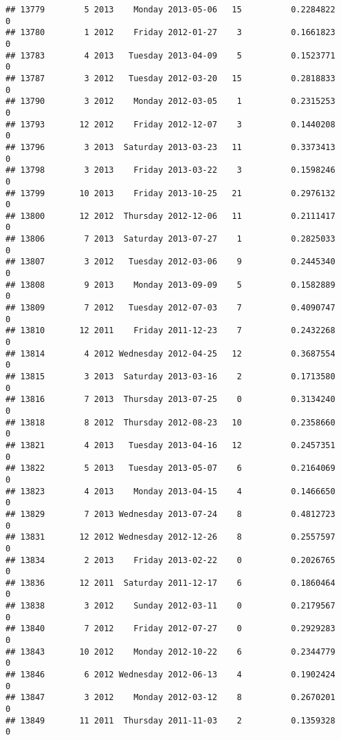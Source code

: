\documentclass[
]{article}
\begin{document}
\begin{verbatim}
## 13779        5 2013    Monday 2013-05-06   15          0.2284822             0
## 13780        1 2012    Friday 2012-01-27    3          0.1661823             0
## 13783        4 2013   Tuesday 2013-04-09    5          0.1523771             0
## 13787        3 2012   Tuesday 2012-03-20   15          0.2818833             0
## 13790        3 2012    Monday 2012-03-05    1          0.2315253             0
## 13793       12 2012    Friday 2012-12-07    3          0.1440208             0
## 13796        3 2013  Saturday 2013-03-23   11          0.3373413             0
## 13798        3 2013    Friday 2013-03-22    3          0.1598246             0
## 13799       10 2013    Friday 2013-10-25   21          0.2976132             0
## 13800       12 2012  Thursday 2012-12-06   11          0.2111417             0
## 13806        7 2013  Saturday 2013-07-27    1          0.2825033             0
## 13807        3 2012   Tuesday 2012-03-06    9          0.2445340             0
## 13808        9 2013    Monday 2013-09-09    5          0.1582889             0
## 13809        7 2012   Tuesday 2012-07-03    7          0.4090747             0
## 13810       12 2011    Friday 2011-12-23    7          0.2432268             0
## 13814        4 2012 Wednesday 2012-04-25   12          0.3687554             0
## 13815        3 2013  Saturday 2013-03-16    2          0.1713580             0
## 13816        7 2013  Thursday 2013-07-25    0          0.3134240             0
## 13818        8 2012  Thursday 2012-08-23   10          0.2358660             0
## 13821        4 2013   Tuesday 2013-04-16   12          0.2457351             0
## 13822        5 2013   Tuesday 2013-05-07    6          0.2164069             0
## 13823        4 2013    Monday 2013-04-15    4          0.1466650             0
## 13829        7 2013 Wednesday 2013-07-24    8          0.4812723             0
## 13831       12 2012 Wednesday 2012-12-26    8          0.2557597             0
## 13834        2 2013    Friday 2013-02-22    0          0.2026765             0
## 13836       12 2011  Saturday 2011-12-17    6          0.1860464             0
## 13838        3 2012    Sunday 2012-03-11    0          0.2179567             0
## 13840        7 2012    Friday 2012-07-27    0          0.2929283             0
## 13843       10 2012    Monday 2012-10-22    6          0.2344779             0
## 13846        6 2012 Wednesday 2012-06-13    4          0.1902424             0
## 13847        3 2012    Monday 2012-03-12    8          0.2670201             0
## 13849       11 2011  Thursday 2011-11-03    2          0.1359328             0

\end{verbatim}
\end{document}
